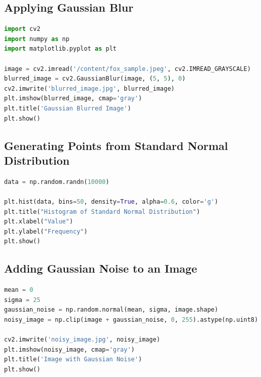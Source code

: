 \documentclass{report}
\begin{document}
\subsection{Applying Gaussian Blur}
\begin{lstlisting}[language=Python, caption=Gaussian Blur, label=code:gaussian-blur]
import cv2
import numpy as np
import matplotlib.pyplot as plt

image = cv2.imread('/content/fox_sample.jpeg', cv2.IMREAD_GRAYSCALE)
blurred_image = cv2.GaussianBlur(image, (5, 5), 0)
cv2.imwrite('blurred_image.jpg', blurred_image)
plt.imshow(blurred_image, cmap='gray')
plt.title('Gaussian Blurred Image')
plt.show()
\end{lstlisting}

\subsection{Generating Points from Standard Normal Distribution}
\begin{lstlisting}[language=Python, caption=Histogram of Standard Normal Distribution, label=code:normal-distribution]
data = np.random.randn(10000)

plt.hist(data, bins=50, density=True, alpha=0.6, color='g')
plt.title("Histogram of Standard Normal Distribution")
plt.xlabel("Value")
plt.ylabel("Frequency")
plt.show()
\end{lstlisting}

\subsection{Adding Gaussian Noise to an Image}
\begin{lstlisting}[language=Python, caption=Adding Gaussian Noise, label=code:gaussian-noise]
mean = 0
sigma = 25
gaussian_noise = np.random.normal(mean, sigma, image.shape)
noisy_image = np.clip(image + gaussian_noise, 0, 255).astype(np.uint8)

cv2.imwrite('noisy_image.jpg', noisy_image)
plt.imshow(noisy_image, cmap='gray')
plt.title('Image with Gaussian Noise')
plt.show()
\end{lstlisting}
\end{document}
